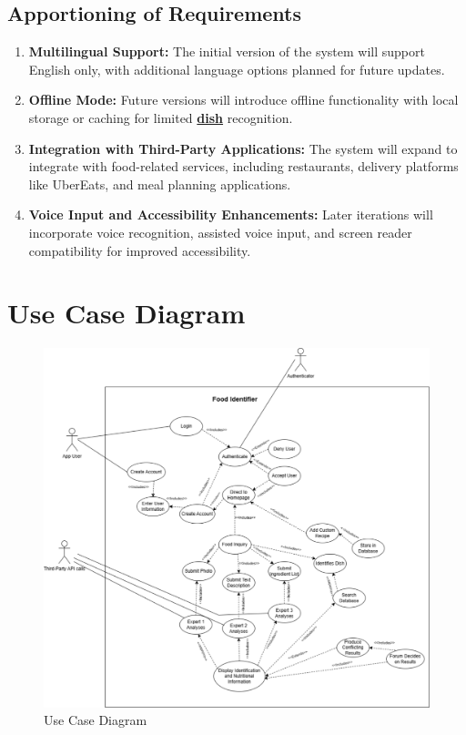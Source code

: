 \documentclass[]{article}
\begin{document}

\subsection{Apportioning of Requirements}
\label{sub:apportioning_of_requirements}
\begin{enumerate}
    \item \textbf{Multilingual Support:} The initial version of the system will support English only, with additional language options planned for future updates.
    \item \textbf{Offline Mode:} Future versions will introduce offline functionality with local storage or caching for limited \hyperref[Dish]{\textbf{dish}} recognition.
    \item \textbf{Integration with Third-Party Applications:} The system will expand to integrate with food-related services, including restaurants, delivery platforms like UberEats, and meal planning applications.
    \item \textbf{Voice Input and Accessibility Enhancements:} Later iterations will incorporate voice recognition, assisted voice input, and screen reader compatibility for improved accessibility.
\end{enumerate}

\section{Use Case Diagram}
\label{sec:use_case_diagram}

\begin{figure}[H]
    \centering
    \includegraphics[width=\textwidth]{image/3_use_case_diagram.pdf}
    \caption{Use Case Diagram}
\end{figure}
\end{document}
